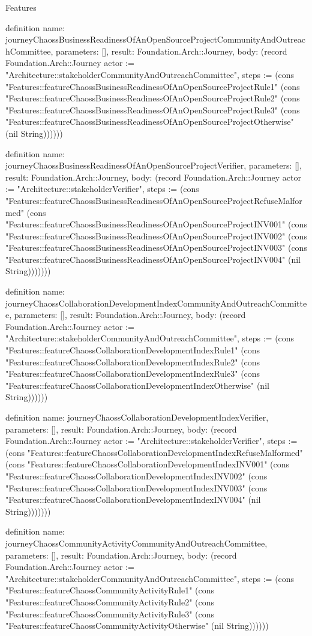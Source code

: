 \begin{lexlean}{Features}
\begin{semanticmodule}
definition{
  name: journeyChaossBusinessReadinessOfAnOpenSourceProjectCommunityAndOutreachCommittee,
  parameters: [],
  result: Foundation.Arch::Journey,
  body: (record Foundation.Arch::Journey {actor := "Architecture::stakeholderCommunityAndOutreachCommittee", steps := (cons "Features::featureChaossBusinessReadinessOfAnOpenSourceProjectRule1" (cons "Features::featureChaossBusinessReadinessOfAnOpenSourceProjectRule2" (cons "Features::featureChaossBusinessReadinessOfAnOpenSourceProjectRule3" (cons "Features::featureChaossBusinessReadinessOfAnOpenSourceProjectOtherwise" (nil String)))))})
}

definition{
  name: journeyChaossBusinessReadinessOfAnOpenSourceProjectVerifier,
  parameters: [],
  result: Foundation.Arch::Journey,
  body: (record Foundation.Arch::Journey {actor := "Architecture::stakeholderVerifier", steps := (cons "Features::featureChaossBusinessReadinessOfAnOpenSourceProjectRefuseMalformed" (cons "Features::featureChaossBusinessReadinessOfAnOpenSourceProjectINV001" (cons "Features::featureChaossBusinessReadinessOfAnOpenSourceProjectINV002" (cons "Features::featureChaossBusinessReadinessOfAnOpenSourceProjectINV003" (cons "Features::featureChaossBusinessReadinessOfAnOpenSourceProjectINV004" (nil String))))))})
}

definition{
  name: journeyChaossCollaborationDevelopmentIndexCommunityAndOutreachCommittee,
  parameters: [],
  result: Foundation.Arch::Journey,
  body: (record Foundation.Arch::Journey {actor := "Architecture::stakeholderCommunityAndOutreachCommittee", steps := (cons "Features::featureChaossCollaborationDevelopmentIndexRule1" (cons "Features::featureChaossCollaborationDevelopmentIndexRule2" (cons "Features::featureChaossCollaborationDevelopmentIndexRule3" (cons "Features::featureChaossCollaborationDevelopmentIndexOtherwise" (nil String)))))})
}

definition{
  name: journeyChaossCollaborationDevelopmentIndexVerifier,
  parameters: [],
  result: Foundation.Arch::Journey,
  body: (record Foundation.Arch::Journey {actor := "Architecture::stakeholderVerifier", steps := (cons "Features::featureChaossCollaborationDevelopmentIndexRefuseMalformed" (cons "Features::featureChaossCollaborationDevelopmentIndexINV001" (cons "Features::featureChaossCollaborationDevelopmentIndexINV002" (cons "Features::featureChaossCollaborationDevelopmentIndexINV003" (cons "Features::featureChaossCollaborationDevelopmentIndexINV004" (nil String))))))})
}

definition{
  name: journeyChaossCommunityActivityCommunityAndOutreachCommittee,
  parameters: [],
  result: Foundation.Arch::Journey,
  body: (record Foundation.Arch::Journey {actor := "Architecture::stakeholderCommunityAndOutreachCommittee", steps := (cons "Features::featureChaossCommunityActivityRule1" (cons "Features::featureChaossCommunityActivityRule2" (cons "Features::featureChaossCommunityActivityRule3" (cons "Features::featureChaossCommunityActivityOtherwise" (nil String)))))})
}


\end{semanticmodule}
\end{lexlean}
